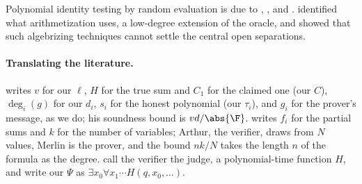 \begin{refsection}
Polynomial identity testing by random evaluation is due to \textcite{DeMilloLipton1978}, \textcite{Zippel1979}, and \textcite{Schwartz1980}. \Textcite{AaronsonWigderson2009} identified what arithmetization uses, a low-degree extension of the oracle, and showed that such algebrizing techniques cannot settle the central open separations.

\paragraph{Translating the literature.} \Textcite{Thaler2022} writes $v$ for our $\ell$, $H$ for the true sum and $C_1$ for the claimed one (our $C$), $\deg_i(g)$ for our $d_i$, $s_i$ for the honest polynomial (our $\tau_i$), and $g_i$ for the prover's message, as we do; his soundness bound is $vd/\abs{\F}$. \Textcite{Babai1990} writes $f_i$ for the partial sums and $k$ for the number of variables; Arthur, the verifier, draws from $N$ values, Merlin is the prover, and the bound $nk/N$ takes the length $n$ of the formula as the degree. \Textcite{IrvingEtAl2018} call the verifier the judge, a polynomial-time function $H$, and write our $\Psi$ as $\exists x_0\forall x_1\cdots H(q,x_0,\dots)$.

\printchapterbib
\end{refsection}
